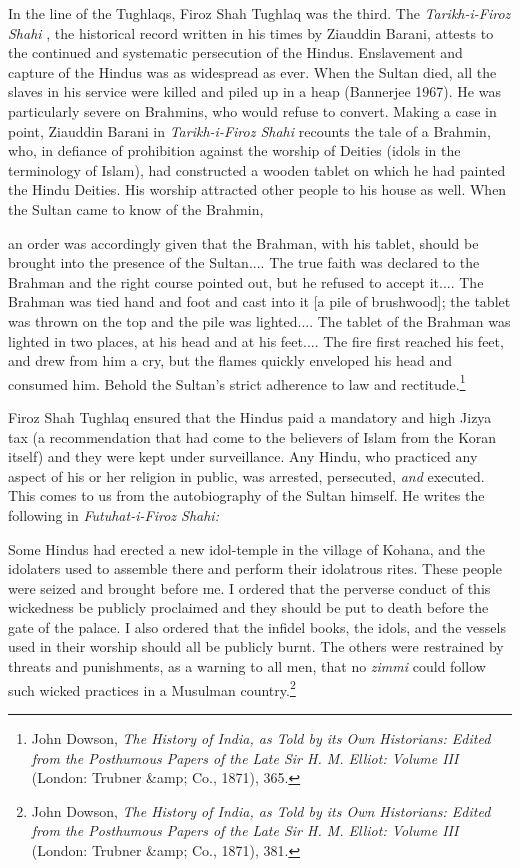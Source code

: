 In the line of the Tughlaqs, Firoz Shah Tughlaq was the third. The \textit{Tarikh-i-Firoz Shahi} , the historical record written in his times by Ziauddin Barani, attests to the continued and systematic persecution of the Hindus. Enslavement and capture of the Hindus was as widespread as ever. When the Sultan died, all the slaves in his service were killed and piled up in a heap (Bannerjee 1967). He was particularly severe on Brahmins, who would refuse to convert. Making a case in point, Ziauddin Barani in \textit{Tarikh-i-Firoz Shahi} recounts the tale of a Brahmin, who, in defiance of prohibition against the worship of Deities (idols in the terminology of Islam), had constructed a wooden tablet on which he had painted the Hindu Deities. His worship attracted other people to his house as well. When the Sultan came to know of the Brahmin,

an order was accordingly given that the Brahman, with his tablet, should be brought into the presence of the Sultan.... The true faith was declared to the Brahman and the right course pointed out, but he refused to accept it.... The Brahman was tied hand and foot and cast into it [a pile of brushwood]; the tablet was thrown on the top and the pile was lighted.... The tablet of the Brahman was lighted in two places, at his head and at his feet.... The fire first reached his feet, and drew from him a cry, but the flames quickly enveloped his head and consumed him. Behold the Sultan's strict adherence to law and rectitude.\footnote{John Dowson, \textit{The History of India, as Told by its Own Historians: Edited from the Posthumous Papers of the Late Sir H. M. Elliot: Volume III} (London: Trubner &amp; Co., 1871), 365.}

Firoz Shah Tughlaq ensured that the Hindus paid a mandatory and high Jizya tax (a recommendation that had come to the believers of Islam from the Koran itself) and they were kept under surveillance. Any Hindu, who practiced any aspect of his or her religion in public, was arrested, persecuted, \textit{and} executed. This comes to us from the autobiography of the Sultan himself. He writes the following in \textit{Futuhat-i-Firoz Shahi:} 

Some Hindus had erected a new idol-temple in the village of Kohana, and the idolaters used to assemble there and perform their idolatrous rites. These people were seized and brought before me. I ordered that the perverse conduct of this wickedness be publicly proclaimed and they should be put to death before the gate of the palace. I also ordered that the infidel books, the idols, and the vessels used in their worship should all be publicly burnt. The others were restrained by threats and punishments, as a warning to all men, that no \textit{zimmi} could follow such wicked practices in a Musulman country.\footnote{John Dowson, \textit{The History of India, as Told by its Own Historians: Edited from the Posthumous Papers of the Late Sir H. M. Elliot: Volume III} (London: Trubner &amp; Co., 1871), 381.}

